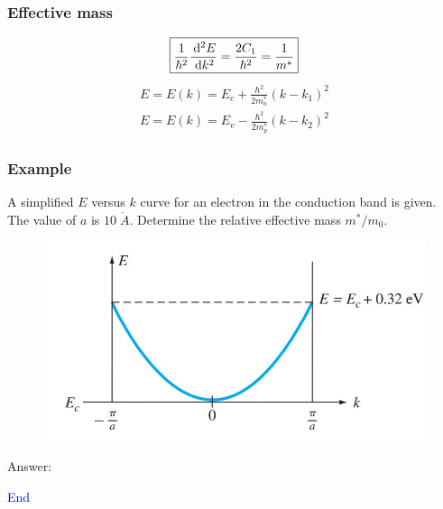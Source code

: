 \documentclass{beamer}
\begin{document}
    \begin{frame} \frametitle{Effective mass}
        \begin{equation*}
            \boxed{\frac{1}{\hbar^2} \frac{\: \mathrm{d}^2 E}{\: \mathrm{d} k^2} = \frac{2C_1}{\hbar^2} = \frac{1}{m^*}  }
        \end{equation*}
        \begin{equation*}
            \begin{aligned}
                E = E(k) = E_c + \frac{\hbar^2}{2m_n^*} (k - k_1)^2 \\
                E = E(k) = E_v - \frac{\hbar^2}{2m_p^*} (k - k_2)^2
            \end{aligned}
        \end{equation*}
    \end{frame}

    \begin{frame} \frametitle{Example}
        A simplified $E$ versus $k$ curve for an electron in the conduction band is given. The value of $a$ is $10 \; \mathring{A}$. Determine the relative effective mass $m^* / m_0$.
        \begin{figure}[H]
            \centering
            \includegraphics[width=0.6\linewidth]{Example-effective-mass.jpg}
            \label{fig:Example-effective-mass.jpg}
        \end{figure}
        Answer: \fbox{\textcolor{white}{1.175}}
    \end{frame}

    \begin{frame} 
        \begin{center}
            \Large\textcolor{blue}{End}
        \end{center}
    \end{frame}
\end{document}
